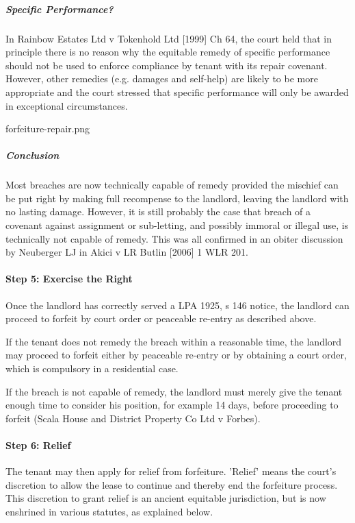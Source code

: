 \documentclass[
]{article}
\begin{document}
\hypertarget{specific-performance}{%
\subparagraph{Specific Performance?}\label{specific-performance}}

In Rainbow Estates Ltd v Tokenhold Ltd {[}1999{]} Ch 64, the court held
that in principle there is no reason why the equitable remedy of
specific performance should not be used to enforce compliance by tenant
with its repair covenant. However, other remedies (e.g. damages and
self-help) are likely to be more appropriate and the court stressed that
specific performance will only be awarded in exceptional circumstances.

forfeiture-repair.png

\hypertarget{conclusion}{%
\subparagraph{Conclusion}\label{conclusion}}

Most breaches are now technically capable of remedy provided the
mischief can be put right by making full recompense to the landlord,
leaving the landlord with no lasting damage. However, it is still
probably the case that breach of a covenant against assignment or
sub-letting, and possibly immoral or illegal use, is technically not
capable of remedy. This was all confirmed in an obiter discussion by
Neuberger LJ in Akici v LR Butlin {[}2006{]} 1 WLR 201.

\hypertarget{step-5-exercise-the-right}{%
\paragraph{Step 5: Exercise the Right}\label{step-5-exercise-the-right}}

Once the landlord has correctly served a LPA 1925, s 146 notice, the
landlord can proceed to forfeit by court order or peaceable re-entry as
described above.

If the tenant does not remedy the breach within a reasonable time, the
landlord may proceed to forfeit either by peaceable re-entry or by
obtaining a court order, which is compulsory in a residential case.

If the breach is not capable of remedy, the landlord must merely give
the tenant enough time to consider his position, for example 14 days,
before proceeding to forfeit (Scala House and District Property Co Ltd v
Forbes).

\hypertarget{step-6-relief}{%
\paragraph{Step 6: Relief}\label{step-6-relief}}

The tenant may then apply for relief from forfeiture. 'Relief' means the
court's discretion to allow the lease to continue and thereby end the
forfeiture process. This discretion to grant relief is an ancient
equitable jurisdiction, but is now enshrined in various statutes, as
explained below.
\end{document}
